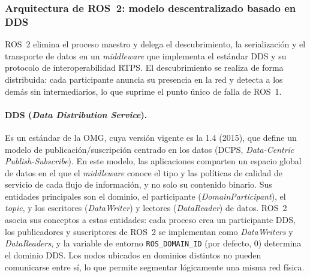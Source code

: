 \subsubsection{Arquitectura de ROS~2: modelo descentralizado basado en DDS}

ROS~2 elimina el proceso maestro y delega el descubrimiento, la serialización y
el transporte de datos en un \textit{middleware} que implementa el estándar DDS
y su protocolo de interoperabilidad RTPS. El descubrimiento se realiza de forma
distribuida: cada participante anuncia su presencia en la red y detecta a los
demás sin intermediarios, lo que suprime el punto único de falla de ROS~1.

\paragraph{DDS (\textit{Data Distribution Service}).} Es un estándar de la
OMG, cuya versión vigente es la 1.4 (2015), que define un modelo de
publicación/suscripción centrado en los datos (DCPS, \textit{Data-Centric
Publish-Subscribe}). En este modelo, las aplicaciones comparten un espacio
global de datos en el que el \textit{middleware} conoce el tipo y las
políticas de calidad de servicio de cada flujo de información, y no solo su
contenido binario. Sus entidades principales son el dominio, el participante
(\textit{DomainParticipant}), el \textit{topic}, y los escritores
(\textit{DataWriter}) y lectores (\textit{DataReader}) de datos. ROS~2 asocia
sus conceptos a estas entidades: cada proceso crea un participante DDS, los
publicadores y suscriptores de ROS~2 se implementan como \textit{DataWriters} y
\textit{DataReaders}, y la variable de entorno \texttt{ROS\_DOMAIN\_ID}
(por defecto, 0) determina el dominio DDS. Los nodos ubicados en dominios
distintos no pueden comunicarse entre sí, lo que permite segmentar
lógicamente una misma red física.

